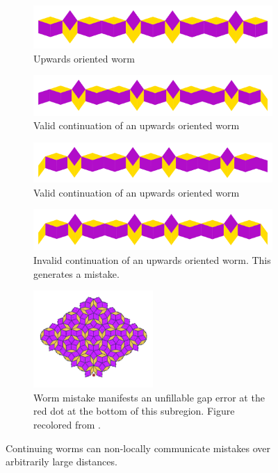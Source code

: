 \documentclass[
  oneside,
  11pt, a4paper,
  footinclude=true,
  headinclude=true,
  cleardoublepage=empty
]{scrbook}
\begin{document}
\begin{figure}[h]
\centering
\begin{subfigure}{\textwidth}
\centering
\includegraphics[width=\textwidth]{reValidWorm0}
\caption{Upwards oriented worm}
\end{subfigure}

\begin{subfigure}{\textwidth}
\centering
\includegraphics[width=\textwidth]{reValidWorm1}
\caption{Valid continuation of an upwards oriented worm}
\end{subfigure}

\begin{subfigure}{\textwidth}
\centering
\includegraphics[width=\textwidth]{reValidWorm2}
\caption{Valid continuation of an upwards oriented worm}
\end{subfigure}

\begin{subfigure}{\textwidth}
\centering
\includegraphics[width=\textwidth]{reInvalidWorm}
\caption{Invalid continuation of an upwards oriented worm. This generates a mistake.}
\end{subfigure}

\begin{subfigure}{\textwidth}
\centering
\includegraphics[width=0.5\textwidth]{illegal}
\caption{Worm mistake manifests an unfillable gap error at the red dot at the bottom of this subregion. Figure recolored from \cite{Austin2007}.}
\end{subfigure}

\caption{Continuing worms can non-locally communicate mistakes over arbitrarily large distances.}
\label{fig:wormmistakes}
\end{figure}
\end{document}
